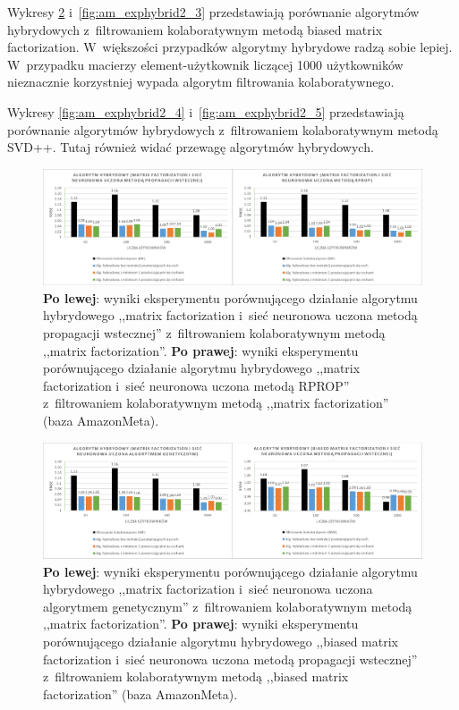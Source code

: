 \documentclass[twoside]{iisthesis}
\begin{document}
		Wykresy \ref{fig:am_exphybrid2_2} i~\ref{fig:am_exphybrid2_3} przedstawiają porównanie algorytmów hybrydowych z~filtrowaniem kolaboratywnym metodą biased matrix factorization. W~większości przypadków algorytmy hybrydowe radzą sobie lepiej. W~przypadku macierzy element-użytkownik liczącej 1000 użytkowników nieznacznie korzystniej wypada algorytm filtrowania kolaboratywnego.
		
		Wykresy \ref{fig:am_exphybrid2_4} i~\ref{fig:am_exphybrid2_5} przedstawiają porównanie algorytmów hybrydowych z~filtrowaniem kolaboratywnym metodą SVD++. Tutaj również widać przewagę algorytmów hybrydowych.
		
		\begin{figure}
			\centering
			\includegraphics[width=1\textwidth]{am_exphybrid2_1}			
			\caption{\textbf{Po lewej}: wyniki eksperymentu porównującego działanie algorytmu hybrydowego ,,matrix factorization i~sieć neuronowa uczona metodą propagacji wstecznej'' z~filtrowaniem kolaboratywnym metodą ,,matrix factorization''. \textbf{Po prawej}: wyniki eksperymentu porównującego działanie algorytmu hybrydowego ,,matrix factorization i~sieć neuronowa uczona metodą RPROP'' z~filtrowaniem kolaboratywnym metodą ,,matrix factorization'' (baza AmazonMeta).}
			\label{fig:am_exphybrid2_1}
		\end{figure}
		
		\begin{figure}
			\centering
			\includegraphics[width=1\textwidth]{am_exphybrid2_2}			
			\caption{\textbf{Po lewej}: wyniki eksperymentu porównującego działanie algorytmu hybrydowego ,,matrix factorization i~sieć neuronowa uczona algorytmem genetycznym'' z~filtrowaniem kolaboratywnym metodą ,,matrix factorization''. \textbf{Po prawej}: wyniki eksperymentu porównującego działanie algorytmu hybrydowego ,,biased matrix factorization i~sieć neuronowa uczona metodą propagacji wstecznej'' z~filtrowaniem kolaboratywnym metodą ,,biased matrix factorization'' (baza AmazonMeta).}
			\label{fig:am_exphybrid2_2}
		\end{figure}
		
\end{document}
